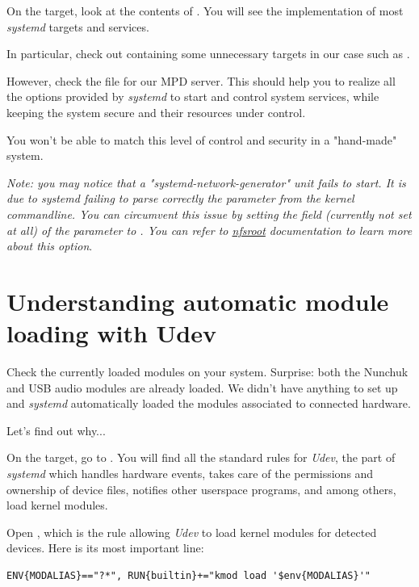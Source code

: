 On the target, look at the contents of . You will
see the implementation of most {\em systemd} targets and services.

In particular, check out  containing
some unnecessary targets in our case such as .

However, check the  file for our MPD server.
This should help you to realize all the options provided
by {\em systemd} to start and control system services, while
keeping the system secure and their resources under control.

You won't be able to match this level of control and security in a
"hand-made" system.

\textit{Note: you may notice that a "systemd-network-generator" unit fails to
start. It is due to systemd failing to parse correctly the 
parameter from the kernel commandline. You can circumvent this issue by
setting the  field (currently not set at all) of the
 parameter to . You can refer to
\href{https://www.kernel.org/doc/Documentation/filesystems/nfs/nfsroot.txt}{nfsroot}
documentation to learn more about this option}.

\section{Understanding automatic module loading with Udev}

Check the currently loaded modules on your system. Surprise: both
the Nunchuk and USB audio modules are already loaded.
We didn't have anything to set up and {\em systemd} automatically loaded
the modules associated to connected hardware.

Let's find out why...

On the target, go to . You will find all the
standard rules for {\em Udev}, the part of {\em systemd} which handles
hardware events, takes care of the permissions and ownership of device
files, notifies other userspace programs, and among others, load
kernel modules.

Open , which is the rule allowing {\em Udev}
to load kernel modules for detected devices. Here is its most important
line:

\begin{verbatim}
ENV{MODALIAS}=="?*", RUN{builtin}+="kmod load '$env{MODALIAS}'"
\end{verbatim}

